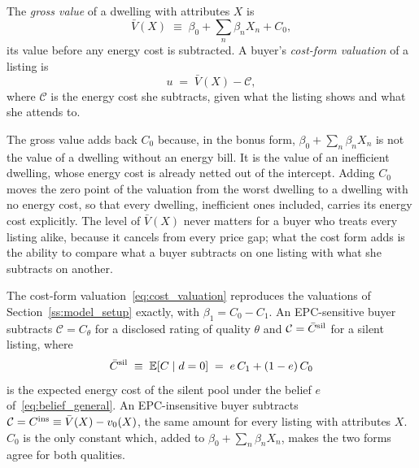 \begin{definition}
\label{def:cost_form}
The \emph{gross value} of a dwelling with attributes $X$ is
\begin{equation}
    \bar V(X)\;\equiv\;\beta_0+\sum_n\beta_nX_n+C_0,
    \label{eq:gross_value}
\end{equation}
its value before any energy cost is subtracted. A buyer's \emph{cost-form valuation} of a listing is
\begin{equation}
    u\;=\;\bar V(X)-\mathcal C,
    \label{eq:cost_valuation}
\end{equation}
where $\mathcal C$ is the energy cost she subtracts, given what the listing shows and what she attends to.
\end{definition}

The gross value adds back $C_0$ because, in the bonus form, $\beta_0+\sum_n\beta_nX_n$ is not the value of a dwelling without an energy bill. It is the value of an inefficient dwelling, whose energy cost is already netted out of the intercept. Adding $C_0$ moves the zero point of the valuation from the worst dwelling to a dwelling with no energy cost, so that every dwelling, inefficient ones included, carries its energy cost explicitly. The level of $\bar V(X)$ never matters for a buyer who treats every listing alike, because it cancels from every price gap; what the cost form adds is the ability to compare what a buyer subtracts on one listing with what she subtracts on another.

\begin{lemma}
\label{lem:cost_form}
The cost-form valuation~\eqref{eq:cost_valuation} reproduces the valuations of Section~\ref{ss:model_setup} exactly, with $\beta_1=C_0-C_1$. An EPC-sensitive buyer subtracts $\mathcal C=C_\theta$ for a disclosed rating of quality $\theta$ and $\mathcal C=\bar C^{\rm sil}$ for a silent listing, where
\begin{equation}
    \bar C^{\rm sil}\;\equiv\;\mathbb E[C\mid d=0]\;=\;e\,C_1+(1-e)\,C_0
    \label{eq:csil}
\end{equation}
is the expected energy cost of the silent pool under the belief $e$ of~\eqref{eq:belief_general}. An EPC-insensitive buyer subtracts $\mathcal C=C^{\rm ins}\equiv\bar V(X)-v_0(X)$, the same amount for every listing with attributes $X$. $C_0$ is the only constant which, added to $\beta_0+\sum_n\beta_nX_n$, makes the two forms agree for both qualities.
\end{lemma}

